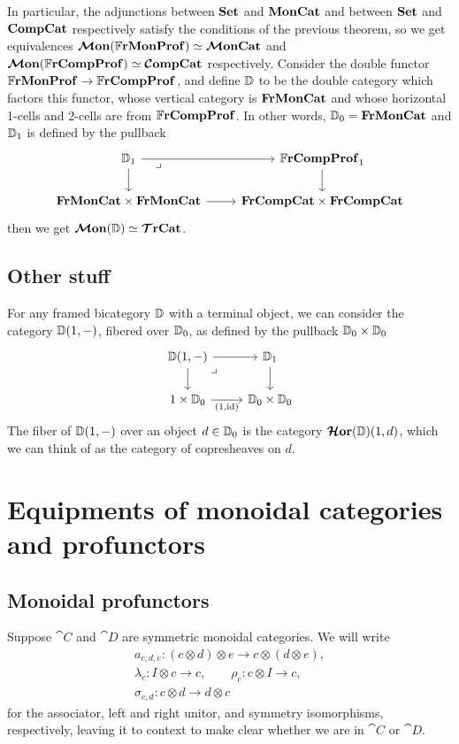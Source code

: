 \documentclass[12pt,oneside,article,draft]{memoir}
\begin{document}
In particular, the adjunctions between $\mathbf{Set}$ and $\mathbf{MonCat}$ and between $\mathbf{Set}$ and $\mathbf{CompCat}$
respectively satisfy the conditions of the previous theorem, so we get equivalences
$\bm{\mathcal{M}}\mathbf{on}(\mathbb{F}\mathbf{rMonProf})\simeq\bm{\mathcal{M}}\mathbf{onCat}$ and $\bm{\mathcal{M}}\mathbf{on}(\mathbb{F}\mathbf{rCompProf})\simeq\bm{\mathcal{C}}\mathbf{ompCat}$ respectively.  Consider
the double functor $\mathbb{F}\mathbf{rMonProf}\to\mathbb{F}\mathbf{rCompProf}$, and define $\mathbb{D}$ to be the double category
which factors this functor, whose vertical category is $\mathbf{FrMonCat}$ and whose horizontal 1-cells and
2-cells are from $\mathbb{F}\mathbf{rCompProf}$.  In other words, $\mathbb{D}_0=\mathbf{FrMonCat}$ and $\mathbb{D}_1$ is defined
by the pullback
\[
   \begin{tikzcd}
      \dcat{D}_1 \ar[r] \ar[d] \ar[dr,phantom,"\lrcorner"very near start]
      & \dFrCompProf_1 \ar[d]
      \\
      \FrMonCat\times\FrMonCat \ar[r]
      & \FrCompCat\times\FrCompCat
   \end{tikzcd}
\]
then we get $\bm{\mathcal{M}}\mathbf{on}(\mathbb{D})\simeq\bm{\mathcal{T}}\mathbf{rCat}$.


\section{Other stuff}

For any framed bicategory $\mathbb{D}$ with a terminal object, we can consider the category
$\mathbb{D}(1,-)$, fibered over $\mathbb{D}_0$, as defined by the pullback $\mathbb{D}_0\times\mathbb{D}_0$
\begin{equation}
   \begin{tikzcd}
      \dcat{D}(1,-) \ar[r] \ar[d] \arrow[dr,phantom,"\lrcorner",very near start]
         & \dcat{D}_1 \ar[d] \\
      1\times\dcat{D}_0 \ar[r,"{(1,\id)}"']
         & \dcat{D}_0\times\dcat{D}_0
   \end{tikzcd}
\end{equation}
The fiber of $\mathbb{D}(1,-)$ over an object $d\in\mathbb{D}_0$ is the category $\bm{\mathcal{H}}\mathbf{or}(\mathbb{D})(1,d)$,
which we can think of as the category of copresheaves on $d$.


\chapter{Equipments of monoidal categories and profunctors}

\section{Monoidal profunctors}

Suppose $\cat{C}$ and $\cat{D}$ are symmetric monoidal categories.  We will write
\begin{gather*}
   a_{c,d,e}\colon (c\otimes d)\otimes e \to c\otimes(d\otimes e), \\
      \lambda_c\colon I\otimes c\to c,
      \qquad \rho_c\colon c\otimes I \to c, \\
      \sigma_{c,d}\colon c\otimes d\to d\otimes c
\end{gather*}
for the associator, left and right unitor, and symmetry isomorphisms, respectively, leaving it to
context to make clear whether we are in $\cat{C}$ or $\cat{D}$.
\end{document}
